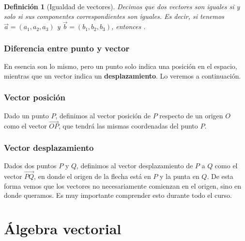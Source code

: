 \documentclass[12pt, fleqn]{report}                             %
\newtheorem{Definition}{Definición}[section]                    %
\newcommand{\lVec}[1]{\overrightarrow{#1}}                      %
\begin{document}
            \begin{Definition}[Igualdad de vectores]
                Decimos que dos vectores son iguales si y solo si sus componentes correspondientes son iguales. Es decir, si tenemos $\vec{a}=(a_1, a_2, a_3)$ y $\vec{b}=(b_1, b_2, b_3)$, entonces .
            \end{Definition}
        
            \subsection{Diferencia entre punto y vector}
            
            En esencia son lo mismo, pero un punto solo indica una posición en el espacio, mientras que un vector indica un \textbf{desplazamiento}. Lo veremos a continuación.
            
            \subsection{Vector posición}
            
            Dado un punto $P$, definimos al vector posición de $P$ respecto de un origen $O$ como el vector $\lVec{OP}$, que tendrá las mismas coordenadas del punto $P$.
            
            \subsection{Vector desplazamiento}
            
            Dados dos puntos $P$ y $Q$, definimos al vector desplazamiento de $P$ a $Q$ como el vector $\lVec{PQ}$, en donde el origen de la flecha está en $P$ y la punta en $Q$. De esta forma vemos que los vectores no necesariamente comienzan en el origen, sino en donde queramos. Es muy importante comprender esto durante todo el curso.
            

















    \chapter{Álgebra vectorial}
            
\end{document}
